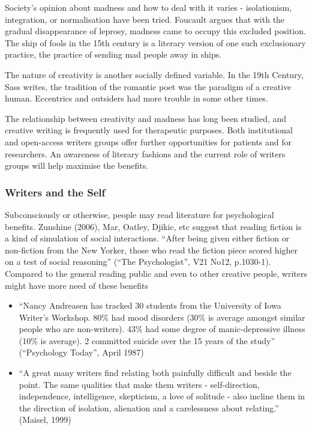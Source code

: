 \documentclass[11pt]{article}
\begin{document}
Society's opinion about madness and how to deal with it varies - isolationism, integration, or normalisation have been tried. Foucault argues that with the gradual disappearance of leprosy, madness came to occupy this excluded position. The ship of fools in the 15th century is a literary version of one such exclusionary practice, the practice of sending mad people away in ships.

The nature of creativity is another socially defined variable. In the 19th Century, Sass writes, the tradition of the romantic poet was the paradigm of a creative human. Eccentrics and outsiders had more trouble in some other times.

The relationship between creativity and madness has long been studied, and creative writing is frequently used for therapeutic purposes. Both institutional and open-access writers groups offer further opportunities for patients and for researchers. An awareness of literary fashions and the current role of writers groups will help maximise the benefits.

\subsubsection*{Writers and the Self}

 Subconsciously or otherwise, people may read literature for psychological benefits. Zunshine (2006), Mar, Oatley, Djikic, etc suggest that reading fiction is a kind of simulation of social interactions. ``After being given either fiction or non-fiction from the New Yorker, those who read the fiction piece scored higher on a test of social reasoning'' (``The Psychologist'', V21 No12, p.1030-1). Compared to the general reading public and even to other creative people, writers might have more need of these benefits

\begin{itemize} 
\item  ``Nancy Andreasen has tracked 30 students from the University of Iowa Writer's Workshop. 80\% had mood disorders (30\% is average amongst similar people who are non-writers). 43\% had some degree of manic-depressive illness (10\% is average). 2 committed suicide over the 15 years of the study'' (``Psychology Today'', April 1987)

\item  ``A great many writers find relating both painfully difficult and beside the point. The same qualities that make them writers - self-direction, independence, intelligence, skepticism, a love of solitude - also incline them in the direction of isolation, alienation and a carelessness about relating.'' (Maisel, 1999)

\end{itemize}
\end{document}
